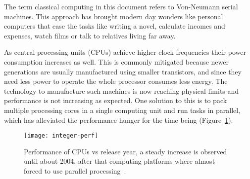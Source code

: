 The term classical computing in this document refers to Von-Neumann serial machines. This approach has brought modern day wonders like personal computers that ease the tasks like writing a novel, calculate incomes and expenses, watch films or talk to relatives living far away. 

As central processing units (CPUs) achieve higher clock frequencies their power consumption increases as well. This is commonly mitigated because newer generations are usually manufactured using smaller transistors, and since they need less power to operate the whole processor consumes less energy. The technology to manufacture such machines is now reaching physical limits and performance is not increasing as expected. One solution to this is to pack multiple processing cores in a single computing unit and run tasks in parallel, which has alleviated the performance hunger for the time being (Figure~\ref{fig:comp:moore}). 

\begin{figure}
  \begin{center}
    \texttt{[image: integer-perf]}
    \caption{Performance of CPUs vs release year, a steady increase is observed until about 2004, after that computing platforms where almost forced to use parallel processing~\cite{int-perf-images}. }
    \label{fig:comp:moore}
  \end{center}
\end{figure}